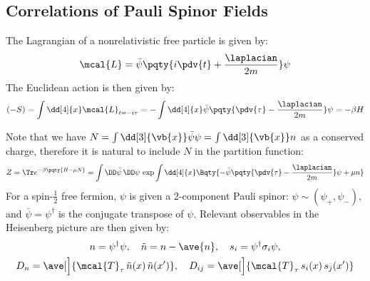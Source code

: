 \documentclass[a4paper,10pt]{article}
\begin{document}
\maketitle
\pagestyle{headings}
\thispagestyle{empty}

\vspace*{-1.5\baselineskip}

\subsection*{Correlations of Pauli Spinor Fields}
	The Lagrangian of a nonrelativistic free particle is given by:
	\begin{equation}
		\mcal{L}
		= \bar{\psi} \pqty{
				i\pdv{t} + \frac{\laplacian}{2m}
			} \psi
	\end{equation}
	The Euclidean action is then given by:
	\begin{equation}
		(-S) = \int \dd[4]{x}
			\mcal{L}_{t = -i\tau}
		= -\int \dd[4]{x}
			\bar{\psi} \pqty{
				\pdv{\tau} - \frac{\laplacian}{2m}
			} \psi
		= -\beta H
	\end{equation}
	
	Note that we have $
		N = \int \dd[3]{\vb{x}} \bar{\psi} \psi
		= \int \dd[3]{\vb{x}} n
	$ as a conserved charge, therefore it is natural to include $N$ in the partition function:
	\begin{equation}
		Z = \Tr e^{-\beta \pqty{H - \mu N}}
		= \int \DD\bar{\psi}\, \DD\psi\,
			\exp \int \dd[4]{x}
				\Bqty{
					- \bar{\psi} \pqty{
						\pdv{\tau} - \frac{\laplacian}{2m}
					} \psi
					+ \mu n
				}
	\end{equation}
	For a spin-$\frac{1}{2}$ free fermion, $\psi$ is given a 2-component Pauli spinor: $
		\psi \sim (\psi_+, \psi_-)
	$, and $\bar{\psi} = \psi^\dagger$ is the conjugate transpose of $\psi$. Relevant observables in the Heisenberg picture are then given by:
	\begin{gather}
		n = \psi^\dagger \psi,\quad
		\tilde{n} = n - \ave{n},\quad
		s_i = \psi^\dagger \sigma_i \psi,
	\\
		D_n = \ave[\Big]{
				\mcal{T}_\tau\,
					\tilde{n}(x)\,
					\tilde{n}(x')
			},\quad
		D_{ij} = \ave[\Big]{
				\mcal{T}_\tau\,
					s_i(x)\,
					s_j(x')
			}
	\end{gather}
	
\end{document}
